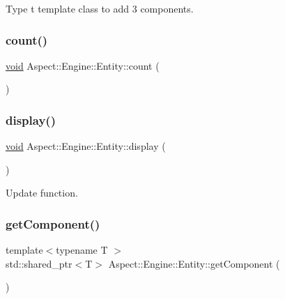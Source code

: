 Type t template class to add 3 components. 

\mbox{\label{class_aspect_1_1_engine_1_1_entity_ad3a033d6bbe1dfa9011e4f2d5ce8c928}} 
\subsubsection{\texorpdfstring{count()}{count()}}
{\footnotesize\ttfamily \mbox{\hyperlink{_s_d_l__opengles2__gl2ext_8h_ae5d8fa23ad07c48bb609509eae494c95}{void}} Aspect\+::\+Engine\+::\+Entity\+::count (\begin{DoxyParamCaption}{ }\end{DoxyParamCaption})}

\mbox{\label{class_aspect_1_1_engine_1_1_entity_ac889f58ccf361ce3ec1126f9df141679}} 
\subsubsection{\texorpdfstring{display()}{display()}}
{\footnotesize\ttfamily \mbox{\hyperlink{_s_d_l__opengles2__gl2ext_8h_ae5d8fa23ad07c48bb609509eae494c95}{void}} Aspect\+::\+Engine\+::\+Entity\+::display (\begin{DoxyParamCaption}{ }\end{DoxyParamCaption})}



Update function. 

\mbox{\label{class_aspect_1_1_engine_1_1_entity_a5fdedcbe74684afa991dc83b6c7b96a1}} 
\subsubsection{\texorpdfstring{get\+Component()}{getComponent()}}
{\footnotesize\ttfamily template$<$typename T $>$ \\
std\+::shared\+\_\+ptr$<$T$>$ Aspect\+::\+Engine\+::\+Entity\+::get\+Component (\begin{DoxyParamCaption}{ }\end{DoxyParamCaption})\hspace{0.3cm}{\ttfamily [inline]}}



